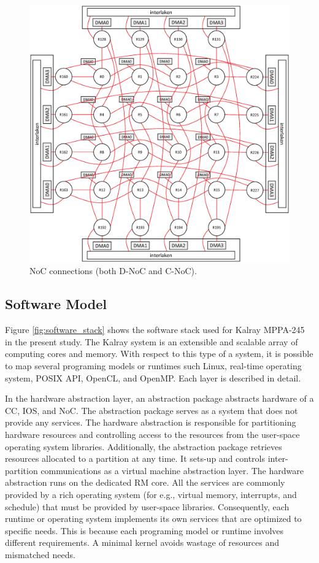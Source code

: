 \documentclass{sig-alternate-05-2015}
\begin{document}
\begin{figure}[t]
  \centering
  \includegraphics[width=1.0\linewidth]{../figure/noc_map.eps}
  \caption{\label{fig:noc_map}
    NoC connections (both D-NoC and C-NoC).}
\end{figure}

\subsection{Software Model}
\label{sec:software_model}
Figure \ref{fig:software_stack} shows the software stack used for Kalray MPPA-245 in the present study.
The Kalray system is an extensible and scalable array of computing cores and memory.
With respect to this type of a system, it is possible to map several programing models or runtimes such Linux, real-time operating system, POSIX API, OpenCL, and OpenMP.
Each layer is described in detail.

In the hardware abstraction layer, an abstraction package abstracts hardware of a CC, IOS, and NoC.
The abstraction package serves as a system that does not provide any services.
The hardware abstraction is responsible for partitioning hardware resources and controlling access to the resources from the user-space operating system libraries.
Additionally, the abstraction package retrieves resources allocated to a partition at any time.
It sets-up and controls inter-partition communications as a virtual machine abstraction layer.
The hardware abstraction runs on the dedicated RM core.
All the services are commonly provided by a rich operating system (for e.g., virtual memory, interrupts, and schedule) that must be provided by user-space libraries.
Consequently, each runtime or operating system implements its own services that are optimized to specific needs.
This is because each programing model or runtime involves different requirements.
A minimal kernel avoids wastage of resources and mismatched needs.
\end{document}

